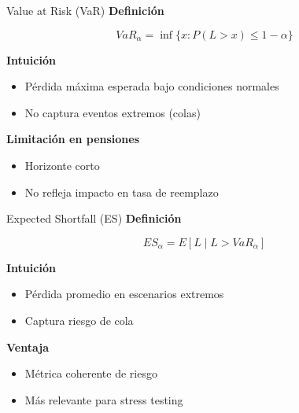 \documentclass{beamer}
\begin{document}
\begin{frame}{Value at Risk (VaR)}
\textbf{Definición}

\[
VaR_\alpha = \inf \{x : P(L > x) \leq 1-\alpha \}
\]

\vspace{0.3cm}

\textbf{Intuición}
\begin{itemize}
\item Pérdida máxima esperada bajo condiciones normales
\item No captura eventos extremos (colas)
\end{itemize}

\vspace{0.3cm}

\textbf{Limitación en pensiones}
\begin{itemize}
\item Horizonte corto
\item No refleja impacto en tasa de reemplazo
\end{itemize}
\end{frame}

\begin{frame}{Expected Shortfall (ES)}
\textbf{Definición}

\[
ES_\alpha = E[L \mid L > VaR_\alpha]
\]

\vspace{0.3cm}

\textbf{Intuición}
\begin{itemize}
\item Pérdida promedio en escenarios extremos
\item Captura riesgo de cola
\end{itemize}

\vspace{0.3cm}

\textbf{Ventaja}
\begin{itemize}
\item Métrica coherente de riesgo
\item Más relevante para stress testing
\end{itemize}
\end{frame}
\end{document}
